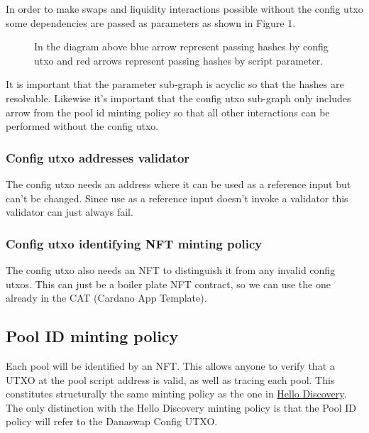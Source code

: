\documentclass{article}
\begin{document}
In order to make swaps and liquidity interactions possible without
the config utxo some dependencies are passed as parameters as shown in Figure 1. \\

\begin{figure}
\caption{
	In the diagram above blue arrow represent passing hashes by
	config utxo and red arrows represent passing hashes by script parameter.
}
\end{figure}

It is important that the parameter sub-graph is acyclic so that
the hashes are resolvable. Likewise it's important that
the config utxo sub-graph only includes arrow from the pool id minting policy
so that all other interactions can be performed without the config utxo.


\subsubsection{Config utxo addresses validator}

The config utxo needs an address where it can be used as a reference
input but can't be changed. Since use as a reference input doesn't
invoke a validator this validator can just always fail.

\subsubsection{Config utxo identifying NFT minting policy}

The config utxo also needs an NFT to distinguish it from any
invalid config utxos. This can just be a boiler plate NFT contract,
so we can use the one already in the CAT (Cardano App Template).

\subsection{Pool ID minting policy}

Each pool will be identified by an NFT. This allows anyone to verify that a UTXO
at the pool script address is valid, as well as tracing each pool. This
constitutes structurally the same minting policy as the one in
\href{https://github.com/ArdanaLabs/cardano-app-template/blob/master/onchain/src/HelloDiscovery.hs}{
  Hello Discovery}.
The only distinction with the Hello Discovery minting policy is that the Pool ID
policy will refer to the Danaswap Config UTXO.
\end{document}
